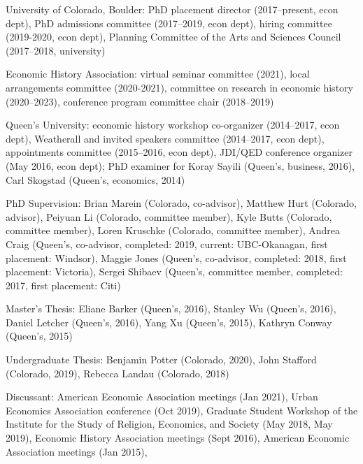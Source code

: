 \documentclass[11pt,letterpaper]{article}
\begin{document}
\begin{description}[leftmargin=0in,itemsep=.25em,itemindent=0in]

\item University of Colorado, Boulder: PhD placement director (2017--present, econ dept), PhD admissions committee (2017--2019, econ dept), hiring committee (2019-2020, econ dept), Planning Committee of the Arts and Sciences Council (2017--2018, university) 

\item Economic History Association: virtual seminar committee (2021), local arrangements committee (2020-2021), committee on research in economic history (2020--2023), conference program committee chair (2018--2019)

\item Queen's University: economic history workshop co-organizer (2014--2017, econ dept), Weatherall and invited speakers committee (2014--2017, econ dept), appointments committee (2015--2016, econ dept), JDI/QED conference organizer (May 2016, econ dept); PhD examiner for Koray Sayili (Queen's, business, 2016), Carl Skogstad (Queen's, economics, 2014)


\item PhD Supervision: Brian Marein (Colorado, co-advisor), Matthew Hurt (Colorado, advisor), Peiyuan Li (Colorado, committee member), Kyle Butts (Colorado, committee member), Loren Kruschke (Colorado, committee member),  Andrea Craig (Queen's, co-advisor, completed: 2019, current: UBC-Okanagan, first placement: Windsor), Maggie Jones (Queen's, co-advisor, completed: 2018, first placement:  Victoria), Sergei Shibaev (Queen's, committee member, completed: 2017, first placement: Citi)

\item Master's Thesis: Eliane Barker (Queen's, 2016),  Stanley Wu (Queen's, 2016), Daniel Letcher (Queen's, 2016), Yang Xu (Queen's, 2015), Kathryn Conway (Queen's, 2015)

\item Undergraduate Thesis: Benjamin Potter (Colorado, 2020), John Stafford (Colorado, 2019), Rebecca Landau (Colorado, 2018) %

\item Discussant: American Economic Association meetings (Jan 2021), Urban Economics Association conference (Oct 2019), Graduate Student Workshop of the Institute for the Study of Religion, Economics, and Society (May 2018, May 2019), Economic History Association meetings (Sept 2016), American Economic Association meetings (Jan 2015),


\end{description}
\end{document}

